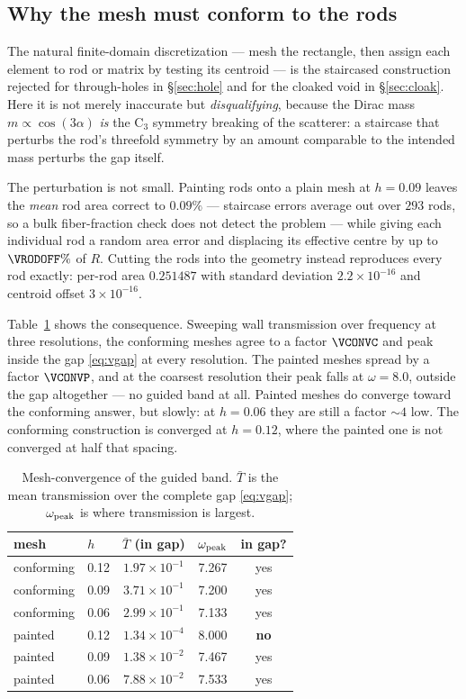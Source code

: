 \documentclass[11pt]{article}
\begin{document}
\subsection{Why the mesh must conform to the rods}
\label{sec:valley:mesh}
The natural finite-domain discretization --- mesh the rectangle, then assign each
element to rod or matrix by testing its centroid --- is the staircased
construction rejected for through-holes in \S\ref{sec:hole} and for the cloaked
void in \S\ref{sec:cloak}. Here it is not merely inaccurate but
\emph{disqualifying}, because the Dirac mass $m\propto\cos(3\alpha)$ \emph{is}
the C$_3$ symmetry breaking of the scatterer: a staircase that perturbs the rod's
threefold symmetry by an amount comparable to the intended mass perturbs the gap
itself.

The perturbation is not small. Painting rods onto a plain mesh at $h=0.09$ leaves
the \emph{mean} rod area correct to $0.09\%$ --- staircase errors average out over
$293$ rods, so a bulk fiber-fraction check does not detect the problem --- while
giving each individual rod a random area error and displacing its effective
centre by up to $\VRODOFF\%$ of $R$. Cutting the rods into the geometry instead
reproduces every rod exactly: per-rod area $0.251487$ with standard deviation
$2.2\times10^{-16}$ and centroid offset $3\times10^{-16}$.

Table~\ref{tab:vconv} shows the consequence. Sweeping wall transmission over
frequency at three resolutions, the conforming meshes agree to a factor
$\VCONVC$ and peak inside the gap \eqref{eq:vgap} at every resolution. The
painted meshes spread by a factor $\VCONVP$, and at the coarsest resolution their
peak falls at $\omega=8.0$, outside the gap altogether --- no guided band at all.
Painted meshes do converge toward the conforming answer, but slowly: at $h=0.06$
they are still a factor $\sim\!4$ low. The conforming construction is converged
at $h=0.12$, where the painted one is not converged at half that spacing.

\begin{table}[h]
\centering
\caption{Mesh-convergence of the guided band. $\bar T$ is the mean transmission
over the complete gap \eqref{eq:vgap}; $\omega_{\rm peak}$ is where transmission
is largest.}
\label{tab:vconv}
\begin{tabular}{llccc}
\toprule
mesh & $h$ & $\bar T$ (in gap) & $\omega_{\rm peak}$ & in gap? \\
\midrule
conforming & 0.12 & $1.97\times10^{-1}$ & 7.267 & yes \\
conforming & 0.09 & $3.71\times10^{-1}$ & 7.200 & yes \\
conforming & 0.06 & $2.99\times10^{-1}$ & 7.133 & yes \\
\midrule
painted    & 0.12 & $1.34\times10^{-4}$ & 8.000 & \textbf{no} \\
painted    & 0.09 & $1.38\times10^{-2}$ & 7.467 & yes \\
painted    & 0.06 & $7.88\times10^{-2}$ & 7.533 & yes \\
\bottomrule
\end{tabular}
\end{table}
\end{document}
